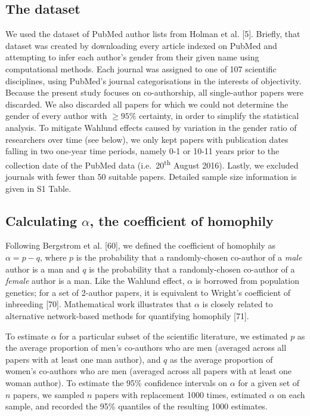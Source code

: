 \documentclass[12pt,]{article}
\begin{document}
\hypertarget{the-dataset}{%
\subsection{The dataset}\label{the-dataset}}

We used the dataset of PubMed author lists from Holman et al. {[}5{]}.
Briefly, that dataset was created by downloading every article indexed
on PubMed and attempting to infer each author's gender from their given
name using computational methods. Each journal was assigned to one of
107 scientific disciplines, using PubMed's journal categorisations in
the interests of objectivity. Because the present study focuses on
co-authorship, all single-author papers were discarded. We also
discarded all papers for which we could not determine the gender of
every author with \({\ge}95\%\) certainty, in order to simplify the
statistical analysis. To mitigate Wahlund effects caused by variation in
the gender ratio of researchers over time (see below), we only kept
papers with publication dates falling in two one-year time periods,
namely 0-1 or 10-11 years prior to the collection date of the PubMed
data (i.e.~20\textsuperscript{th} August 2016). Lastly, we excluded
journals with fewer than 50 suitable papers. Detailed sample size
information is given in S1 Table.

\hypertarget{calculating-alpha-the-coefficient-of-homophily}{%
\subsection{\texorpdfstring{Calculating \(\alpha\), the coefficient of
homophily}{Calculating \textbackslash{}alpha, the coefficient of homophily}}\label{calculating-alpha-the-coefficient-of-homophily}}

Following Bergstrom et al. {[}60{]}, we defined the coefficient of
homophily as \(\alpha = p - q\), where \(p\) is the probability that a
randomly-chosen co-author of a \emph{male} author is a man and \(q\) is
the probability that a randomly-chosen co-author of a \emph{female}
author is a man. Like the Wahlund effect, \(\alpha\) is borrowed from
population genetics; for a set of 2-author papers, it is equivalent to
Wright's coefficient of inbreeding {[}70{]}. Mathematical work
illustrates that \(\alpha\) is closely related to alternative
network-based methods for quantifying homophily {[}71{]}.

To estimate \(\alpha\) for a particular subset of the scientific
literature, we estimated \(p\) as the average proportion of men's
co-authors who are men (averaged across all papers with at least one man
author), and \(q\) as the average proportion of women's co-authors who
are men (averaged across all papers with at least one woman author). To
estimate the 95\% confidence intervals on \(\alpha\) for a given set of
\(n\) papers, we sampled \(n\) papers with replacement 1000 times,
estimated \(\alpha\) on each sample, and recorded the 95\% quantiles of
the resulting 1000 estimates.
\end{document}
